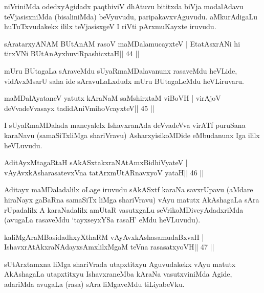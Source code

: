 \begin{artha}
niVriniMda odedxyAgidadx paqthiviV dhAtuvu bititxda biVja modalAdavu teVjasisxniMda (bisaliniMda) beVyuvudu, paripakavxvAguvudu. aMkurAdigaLu huTuTxvudakekx ililx teVjasisxgeV I riVti pArxmuKayxte iruvudu.
\end{artha}

\begin{shl}
sAratarxyANAM BUtAnAM rasoV maMDalamucayxteV |
EtatAsxrANi hi tirxVNi BUtAnAyxhuviRpashicxtaH\hfill || 44 ||
\end{shl}

\begin{artha}
mUru BUtagaLa sAraveMdu sUyaRmaMDalavanunx rasaveMdu heVLide, vidAvxMsarU saha ide sAravuLaLxdudx mUru BUtagaLeMdu heVLiruvaru.
\end{artha}

\begin{shl}
maMDalAyataneV yatutx kAraNaM saMshirxtaM viBoVH |
virAjoV deVvadeVvasayx tadidAniVmihoVcayxteV\hfill || 45 ||
\end{shl}

\begin{artha}
I sUyaRmaMDalada maneyalelx IshavxranAda deVvadeVva virATf puruSana karaNavu (samaSiTxliMga shariVravu) AsharxyisikoMDide eMbudanunx Iga ililx heVLuvudu.
\end{artha}

\begin{shl}
AditAyxMtagaRtaH sAkASxtakxraNAtAmx\s BidhiVyateV |
vAyAvxkAsharasatevxVna tatArxmUtARnavxyoV yataH\hfill || 46 ||
\end{shl}

\begin{artha}
Aditayx maMDaladalilx oLage iruvudu sAkASxtf karaNa savxrUpavu (aMdare hiraNayx gaBaRna samaSiTx liMga shariVravu) vAyu matutx AkAshagaLa sAra rUpadalilx A karaNadalilx amUtaR vasutxgaLu seVrikoMDiveyAdadxriMda (avugaLa rasaveMdu `tayxseyxYSa rasaH' eMdu heVLuvudu).
\end{artha}

\begin{shl}
kaliMgAraMBasidadhxyXthaRM vAyAvxkAshasamudaBxvaH |
IshavxrAtAkxraNAdayxsAmxlilxMgaM teVna rasasatxyoVH\hfill || 47 ||
\end{shl}

\begin{artha}
sUtArxtamxna liMga shariVrada utapxtitxyu Aguvudakekx vAyu matutx AkAshagaLa utapxtitxyu IshavxraneMba kAraNa vasutxviniMda Agide, adariMda avugaLa (rasa) sAra liMgaveMdu tiLiyabeVku.
\end{artha}

